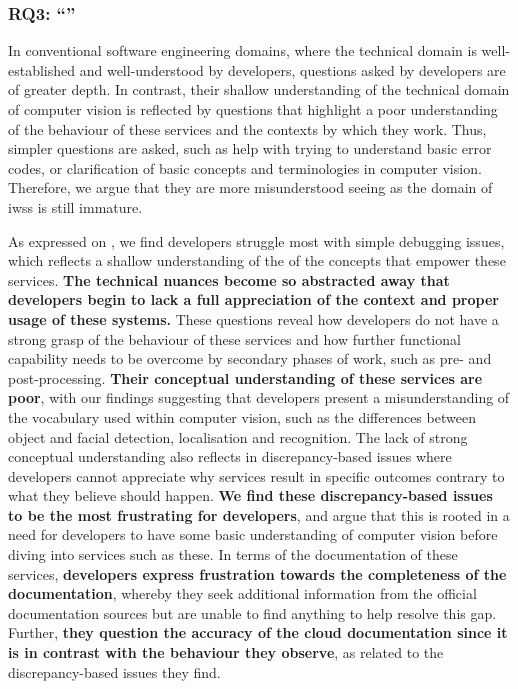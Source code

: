 \subsubsection[Answering RQ3]{RQ3: ``\RQThreeTextDevMiscomprehension{}''}

\begin{callout}
In conventional software engineering domains, where the technical domain is well-established and well-understood by developers, questions asked by developers are of greater depth. In contrast, their shallow understanding of the technical domain of computer vision is reflected by questions that highlight a poor understanding of the behaviour of these services and the contexts by which they work. Thus, simpler questions are asked, such as help with trying to understand basic error codes, or clarification of basic concepts and terminologies in computer vision. Therefore, we argue that they are more misunderstood seeing as the domain of \glspl{iws} is still immature.
\end{callout}
As expressed on , we find developers struggle most with simple debugging issues, which reflects a shallow understanding of the of the  concepts that empower these services. \textbf{The technical nuances become so abstracted away that developers begin to lack a full appreciation of the context and proper usage of these systems.} These questions reveal how developers do not have a strong grasp of the behaviour of these services and how further functional capability needs to be overcome by secondary phases of work, such as pre- and post-processing. \textbf{Their conceptual understanding of these services are poor}, with our findings suggesting that developers present a misunderstanding of the vocabulary used within computer vision, such as the differences between object and facial detection, localisation and recognition. The lack of strong conceptual understanding also reflects in discrepancy-based issues where developers cannot appreciate why services result in specific outcomes contrary to what they believe should happen.
\textbf{We find these discrepancy-based issues to be the most frustrating for developers}, and argue that this is rooted in a need for developers to have some basic understanding of computer vision before diving into services such as these. In terms of the documentation of these services, \textbf{developers express frustration towards the completeness of the documentation}, whereby they seek additional information from the official documentation sources but are unable to find anything to help resolve this gap. Further, \textbf{they question the accuracy of the cloud documentation since it is in contrast with the behaviour they observe}, as related to the discrepancy-based issues they find. 
